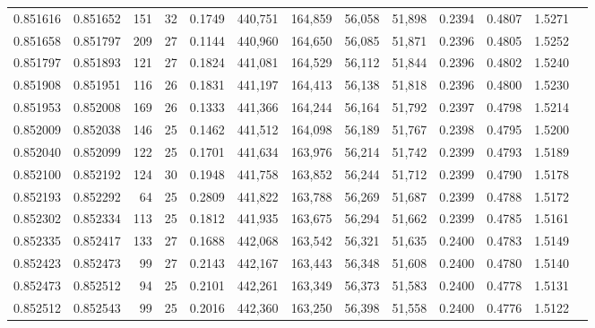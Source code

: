 \begin{tabular}{rrrrrrrrrrrrr}
0.851616 & 0.851652 &   151 &  32 &                                     0.1749 & 440,751 & 164,859 &  56,058 &  51,898 & 0.2394 & 0.4807 & 1.5271 \\
0.851658 & 0.851797 &   209 &  27 &                                     0.1144 & 440,960 & 164,650 &  56,085 &  51,871 & 0.2396 & 0.4805 & 1.5252 \\
0.851797 & 0.851893 &   121 &  27 &                                     0.1824 & 441,081 & 164,529 &  56,112 &  51,844 & 0.2396 & 0.4802 & 1.5240 \\
0.851908 & 0.851951 &   116 &  26 &                                     0.1831 & 441,197 & 164,413 &  56,138 &  51,818 & 0.2396 & 0.4800 & 1.5230 \\
0.851953 & 0.852008 &   169 &  26 &                                     0.1333 & 441,366 & 164,244 &  56,164 &  51,792 & 0.2397 & 0.4798 & 1.5214 \\
0.852009 & 0.852038 &   146 &  25 &                                     0.1462 & 441,512 & 164,098 &  56,189 &  51,767 & 0.2398 & 0.4795 & 1.5200 \\
0.852040 & 0.852099 &   122 &  25 &                                     0.1701 & 441,634 & 163,976 &  56,214 &  51,742 & 0.2399 & 0.4793 & 1.5189 \\
0.852100 & 0.852192 &   124 &  30 &                                     0.1948 & 441,758 & 163,852 &  56,244 &  51,712 & 0.2399 & 0.4790 & 1.5178 \\
0.852193 & 0.852292 &    64 &  25 &                                     0.2809 & 441,822 & 163,788 &  56,269 &  51,687 & 0.2399 & 0.4788 & 1.5172 \\
0.852302 & 0.852334 &   113 &  25 &                                     0.1812 & 441,935 & 163,675 &  56,294 &  51,662 & 0.2399 & 0.4785 & 1.5161 \\
0.852335 & 0.852417 &   133 &  27 &                                     0.1688 & 442,068 & 163,542 &  56,321 &  51,635 & 0.2400 & 0.4783 & 1.5149 \\
0.852423 & 0.852473 &    99 &  27 &                                     0.2143 & 442,167 & 163,443 &  56,348 &  51,608 & 0.2400 & 0.4780 & 1.5140 \\
0.852473 & 0.852512 &    94 &  25 &                                     0.2101 & 442,261 & 163,349 &  56,373 &  51,583 & 0.2400 & 0.4778 & 1.5131 \\
0.852512 & 0.852543 &    99 &  25 &                                     0.2016 & 442,360 & 163,250 &  56,398 &  51,558 & 0.2400 & 0.4776 & 1.5122 \\

\end{tabular}
